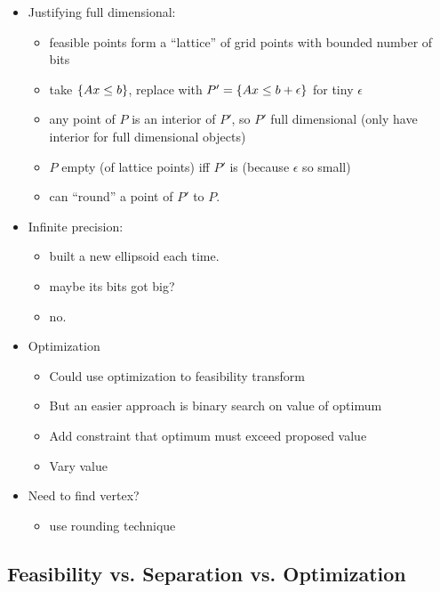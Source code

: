 \documentclass{article}
\begin{document}
\begin{itemize}
\item Justifying full dimensional:
\begin{itemize}
	\item feasible points form a ``lattice'' of grid points with bounded
	number of bits
	\item take $\{ Ax \le b \}$, replace with $P'=\{ Ax \le b+\epsilon \}$
	for tiny $\epsilon$
	\item any point of $P$ is an interior of $P'$, so $P'$ full
	dimensional (only have interior for full dimensional objects)
	\item $P$ empty (of lattice points) iff $P'$ is (because $\epsilon$ so small)
	\item can ``round'' a point of $P'$ to $P$.
\end{itemize}

\item Infinite precision:
\begin{itemize}
	\item built a new ellipsoid each time.
	\item maybe its bits got big?
	\item no.
\end{itemize}

\item Optimization
\begin{itemize}
	\item Could use optimization to feasibility transform
	\item But an easier approach is binary search on value of optimum
	\item Add constraint that optimum must exceed proposed value
	\item Vary value
\end{itemize}

\item Need to find vertex?
\begin{itemize}
	\item use rounding technique
\end{itemize}

\end{itemize}








\subsection{Feasibility vs. Separation vs. Optimization}
\end{document}
